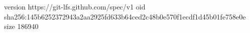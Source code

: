 version https://git-lfs.github.com/spec/v1
oid sha256:145b6252372943a2aa2925fd633b64ced2c48b0e570f1ecdf1d45b01fe758e0e
size 186940
